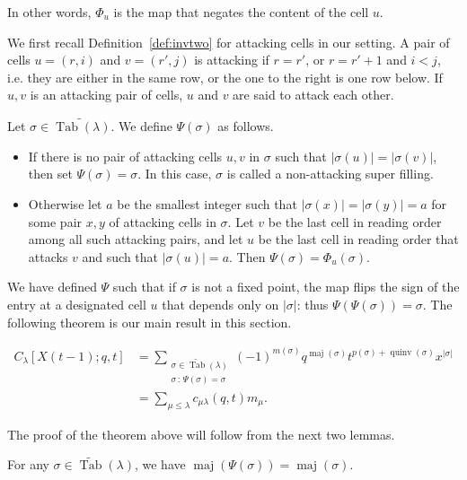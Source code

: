 \documentclass[ALCO,Unicode]{cedram}
\DeclareMathOperator{\PQT}{Tab}
\DeclareMathOperator{\maj}{maj}
\DeclareMathOperator{\quinv}{quinv}
\begin{document}
In other words, $\Phi_u$ is the map that negates the content of the cell $u$. 

We first recall Definition~\ref{def:invtwo} for attacking cells in our setting. A pair of cells $u=(r,i)$ and $v=(r',j)$ is attacking if $r=r'$, or $r=r'+1$ and $i<j$, i.e. they are either in the same row, or the one to the right is one row below. If $u,v$ is an attacking pair of cells, $u$ and $v$ are said to attack each other.

\vspace{0.1in}
\begin{defn}
\label{def:attackpair}
Let $\sigma \in\widetilde{\PQT(\lambda)}$. We define $\Psi(\sigma)$ as follows.
\begin{itemize}[leftmargin=10pt]
\item If there is no pair of attacking cells $u,v$ in $\sigma$ such that $|\sigma(u)|=|\sigma(v)|$, then set $\Psi(\sigma)=\sigma$. In this case, $\sigma$ is called a non-attacking super filling.
\item Otherwise let $a$ be the smallest integer such that $|\sigma(x)|=|\sigma(y)|=a$ for some pair $x,y$ of attacking cells in $\sigma$. Let $v$ be the last cell in reading order among all such attacking pairs, and let $u$ be the last cell in reading order that attacks $v$ and such that $|\sigma(u)|=a$. Then $\Psi(\sigma)=\Phi_u(\sigma)$.
\end{itemize}
\end{defn}

We have defined $\Psi$ such that if $\sigma$ is not a fixed point, the map flips the sign of the entry at a designated cell $u$ that depends only on $|\sigma|$: thus $\Psi(\Psi(\sigma))=\sigma$. The following theorem is our main result in this section.

\begin{theorem}
\label{lem:A1FP}
\begin{align*}
C_{\lambda}[X(t-1);q,t]& = \sum_{\substack{\sigma\in\widetilde{\PQT}(\lambda)\\\sigma\,:\,\Psi(\sigma)=\sigma}} (-1)^{m(\sigma)} q^{\maj(\sigma)}t^{p(\sigma)+\quinv(\sigma)}x^{|\sigma|}\\
&=\sum_{\mu \leq \lambda} c_{\mu\lambda}(q,t)m_{\mu}.
\end{align*}
\end{theorem}

The proof of the theorem above will follow from the next two lemmas.

\begin{lemma}\label{lem:A1maj}
For any $\sigma\in\widetilde{\PQT}(\lambda)$, we have $\maj(\Psi(\sigma))=\maj(\sigma)$.
\end{lemma}
\end{document}
